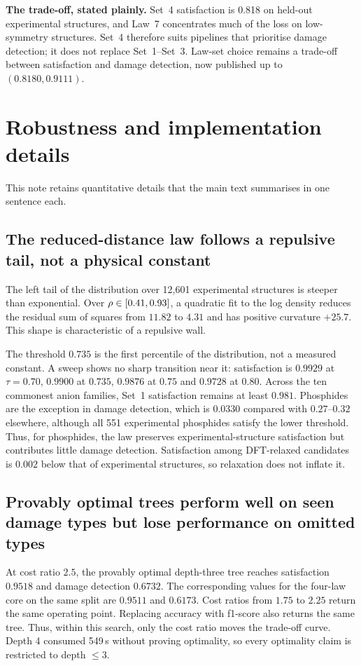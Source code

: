 \textbf{The trade-off, stated plainly.} Set~4 satisfaction is 0.818 on held-out
experimental structures, and Law~7 concentrates much of the loss on low-symmetry
structures. Set~4 therefore suits pipelines that prioritise damage detection; it
does not replace Set~1--Set~3. Law-set choice remains a trade-off between
satisfaction and damage detection, now published up to $(0.8180,0.9111)$.

\section{Robustness and implementation details}\label{note:s18}

This note retains quantitative details that the main text
summarises in one sentence each.

\subsection{The reduced-distance law follows a repulsive tail, not a physical constant}

The left tail of the \rhoc{} distribution over 12{,}601 experimental structures is
steeper than exponential. Over $\rho \in [0.41, 0.93]$, a quadratic fit to the log
density reduces the residual sum of squares from $11.82$ to $4.31$ and has positive
curvature $+25.7$. This shape is characteristic of a repulsive wall.

The threshold $0.735$ is the first percentile of the distribution, not a measured
constant. A sweep shows no sharp transition near it: satisfaction is $0.9929$ at
$\tau=0.70$, $0.9900$ at $0.735$, $0.9876$ at $0.75$ and $0.9728$ at $0.80$.
Across the ten commonest anion families, Set~1 satisfaction remains at least $0.981$.
Phosphides are the exception in damage detection, which is $0.0330$ compared with
$0.27$--$0.32$ elsewhere, although all 551 experimental phosphides satisfy the lower
threshold. Thus, for phosphides, the law preserves experimental-structure satisfaction but
contributes little damage detection. Satisfaction among DFT-relaxed candidates is
$0.002$ below that of experimental structures, so relaxation does not inflate it.

\subsection{Provably optimal trees perform well on seen damage types but lose performance on omitted types}

At cost ratio $2.5$, the provably optimal depth-three tree reaches satisfaction $0.9518$
and damage detection $0.6732$. The corresponding values for the four-law core on the
same split are $0.9511$ and $0.6173$. Cost ratios from $1.75$ to $2.25$ return the same
operating point. Replacing accuracy with f1-score also returns the same tree. Thus, within
this search, only the cost ratio moves the trade-off curve. Depth 4 consumed 549\,s
without proving optimality, so every optimality claim is restricted to depth $\leq 3$.

